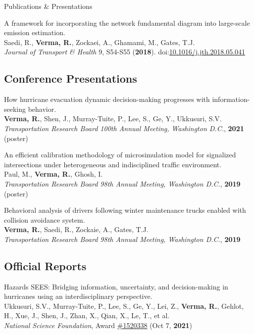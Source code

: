 \documentclass{resume} %
\begin{document}
\begin{rSection}{Publications \& Presentations}
\begin{etaremune}
            \item A framework for incorporating the network fundamental diagram into large-scale emission estimation.
            \\ Saedi, R., \textbf{Verma, R.}, Zockaei, A., Ghamami, M., Gates, T.J.
            \\ \textit{Journal of Transport \& Health} 9, S54-S55 (\textbf{2018}). doi:\href{https://www.sciencedirect.com/science/article/abs/pii/S2214140518302263}{10.1016/j.jth.2018.05.041}
        \end{etaremune}

        \subsection*{Conference Presentations}
        \begin{etaremune}
            \item How hurricane evacuation dynamic decision-making progresses with information-seeking behavior.
            \\ \textbf{Verma, R.}, Shen, J., Murray-Tuite, P., Lee, S., Ge, Y., Ukkusuri, S.V.
            \\ \textit{Transportation Research Board 100th Annual Meeting, Washington D.C.}, \textbf{2021} (poster)

            \item An efficient calibration methodology of microsimulation model for signalized intersections under heterogeneous and indisciplined traffic environment.
            \\ Paul, M., \textbf{Verma, R.}, Ghosh, I.
            \\ \textit{Transportation Research Board 98th Annual Meeting, Washington D.C.}, \textbf{2019} (poster)

            \item Behavioral analysis of drivers following winter maintenance trucks enabled with collision avoidance system.
            \\ \textbf{Verma, R.}, Saedi, R., Zockaie, A., Gates, T.J.
            \\ \textit{Transportation Research Board 98th Annual Meeting, Washington D.C.}, \textbf{2019}
        \end{etaremune}

        \subsection*{Official Reports}
        \begin{etaremune}
            \item Hazards SEES: Bridging information, uncertainty, and decision-making in hurricanes using an interdisciplinary perspective.
            \\ Ukkusuri, S.V., Murray-Tuite, P., Lee, S., Ge, Y., Lei, Z., \textbf{Verma, R.}, Gehlot, H., Xue, J., Shen, J., Zhan, X., Qian, X., Le, T., et al.
            \\ \textit{National Science Foundation}, Award \href{https://www.nsf.gov/awardsearch/showAward?AWD_ID=1520338}{\#1520338} (Oct 7, \textbf{2021})


\end{etaremune}
\end{rSection}
\end{document}
